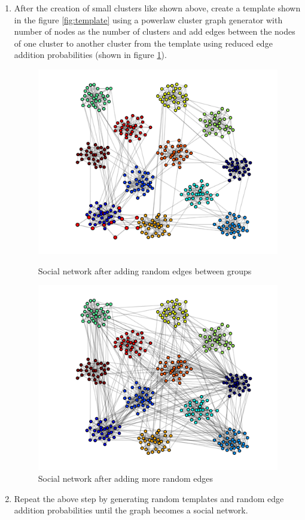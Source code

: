 \begin{enumerate}
\begin{figure}[H]
	\end{figure}
	\item
	After the creation of small clusters like shown above, create a template shown in the figure \ref{fig:template} using a powerlaw cluster graph generator with number of nodes as the number of clusters and add edges between the nodes of one cluster to another cluster from the template using reduced edge addition probabilities (shown in figure \ref{fig:moreedges}).
	\begin{figure}
		\begin{minipage}{.5\textwidth}
			\centering
			\includegraphics[scale=0.22]{Images/datasetgen3.pdf}
			\caption{Social network after adding random edges between groups \label{fig:moreedges}}
		\end{minipage}
		\begin{minipage}{.5\textwidth}
			\centering
			\includegraphics[scale=0.22]{Images/datasetgen4.pdf}
			\caption{Social network after adding more random edges}
		\end{minipage}	
	\end{figure}
	\item
	Repeat the above step by generating random templates and random edge addition probabilities until the graph becomes a social network.
\end{enumerate}